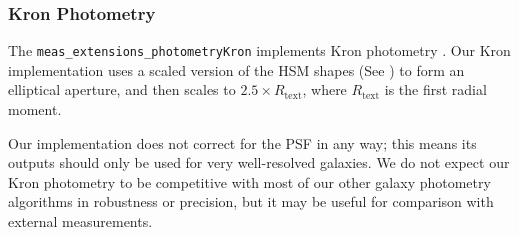 \subsubsection{Kron Photometry}
\label{sec:kron}

The \texttt{meas\_extensions\_photometryKron} implements Kron photometry \citep{1980ApJS...43..305K}.
Our Kron implementation uses a scaled version of the HSM shapes (See ) to form an elliptical aperture, and then scales to $2.5 \times R_{\mathrm{text}}$, where $R_{\mathrm{text}}$ is the first radial moment.

Our implementation does not correct for the PSF in any way; this means its outputs should only be used for very well-resolved galaxies.
We do not expect our Kron photometry to be competitive with most of our other galaxy photometry algorithms in robustness or precision, but it may be useful for comparison with external measurements.
